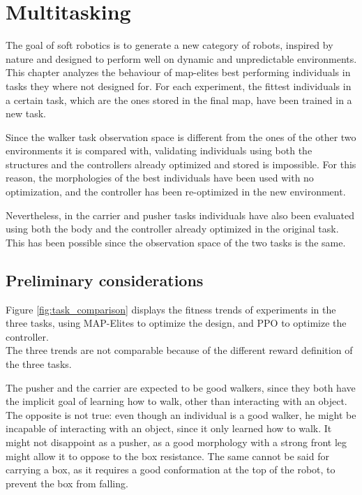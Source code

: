 \chapter{Multitasking}
\label{cha:multitasking}

The goal of soft robotics is to generate a new category of robots, inspired by nature and designed to perform well on dynamic and unpredictable environments.\\
This chapter analyzes the behaviour of map-elites best performing individuals in tasks they where not designed for.
For each experiment, the fittest individuals in a certain task, which are the ones stored in the final map, have been trained in a new task.

Since the walker task observation space is different from the ones of the other two environments it is compared with, validating individuals using both the structures and the controllers already optimized and stored is impossible.
For this reason, the morphologies of the best individuals have been used with no optimization, and the controller has been re-optimized in the new environment.

Nevertheless, in the carrier and pusher tasks individuals have also been evaluated using both the body and the controller already optimized in the original task. This has been possible since the observation space of the two tasks is the same.


\section{Preliminary considerations}
Figure \ref{fig:task_comparison} displays the fitness trends of experiments in the three tasks, using MAP-Elites to optimize the design, and PPO to optimize the controller.\\
The three trends are not comparable because of the different reward definition of the three tasks.

The pusher and the carrier are expected to be good walkers, since they both have the implicit goal of learning how to walk, other than interacting with an object. The opposite is not true: even though an individual is a good walker, he might be incapable of interacting with an object, since it only learned how to walk. It might not disappoint as a pusher, as a good morphology with a strong front leg might allow it to oppose to the box resistance. The same cannot be said for carrying a box, as it requires a good conformation at the top of the robot, to prevent the box from falling.

